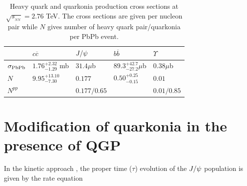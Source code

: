 \documentclass[aps,prc,preprint,superscriptaddress,showpacs,showkeys]{revtex4-1}
\begin{document}
\begin{table}
\caption[]{Heavy quark and quarkonia production  cross sections at
$\sqrt{s_{_{NN}}}= 2.76$ TeV. The cross sections are given per nucleon pair while
$N$ gives number of heavy quark pair/quarkonia per PbPb event.}
\label{NLOcros}
\begin{tabular}{l|l|l|l|l} 
\hline 
\hline
             & $ c \overline c$       &$J/\psi$       & $ b \overline b$        & $\Upsilon$   \\              
\hline
$\sigma_{\rm PbPb}$ & $1.76^{+2.32}_{-1.29}$ mb  & $31.4 \mu$b   & $89.3^{+42.7}_{-27.2} \mu$b  & $0.38 \mu$b  \\
$N$              & $9.95^{+13.10}_{-7.30}$     & $0.177$       & $0.50^{+0.25}_{-0.15}$       & $0.01$       \\
$N^{pp}$          &                         & $0.177/0.65$  &                        & $0.01/0.85$   \\
\hline
\hline
\end{tabular}
\end{table}





\section{Modification of quarkonia in the presence of QGP}
 In the kinetic approach \cite{Thews:2000rj}, the proper time ($\tau$) evolution of the $J/\psi$ population 
is given by the rate equation 
\end{document}
